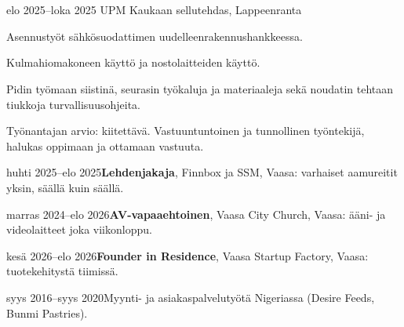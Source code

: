 \documentclass[a4paper,11pt]{article}
\begin{document}
\section{}
\begin{cventry}{elo 2025--loka 2025}{}
  UPM Kaukaan sellutehdas, Lappeenranta\par
  Asennustyöt sähkösuodattimen uudelleenrakennushankkeessa.\par
  Kulmahiomakoneen käyttö ja nostolaitteiden käyttö.\par
  Pidin työmaan siistinä, seurasin työkaluja ja materiaaleja sekä noudatin tehtaan tiukkoja turvallisuusohjeita.\par
  Työnantajan arvio: kiitettävä. Vastuuntuntoinen ja tunnollinen työntekijä, halukas oppimaan ja ottamaan vastuuta.
\end{cventry}
\begin{cventry}{huhti 2025--elo 2025}{\textbf{Lehdenjakaja}, Finnbox ja SSM, Vaasa: varhaiset aamureitit yksin, säällä kuin säällä.}
\end{cventry}
\begin{cventry}{marras 2024--elo 2026}{\textbf{AV-vapaaehtoinen}, Vaasa City Church, Vaasa: ääni- ja videolaitteet joka viikonloppu.}
\end{cventry}
\begin{cventry}{kesä 2026--elo 2026}{\textbf{Founder in Residence}, Vaasa Startup Factory, Vaasa: tuotekehitystä tiimissä.}
\end{cventry}
\begin{cventry}{syys 2016--syys 2020}{Myynti- ja asiakaspalvelutyötä Nigeriassa (Desire Feeds, Bunmi Pastries).}
\end{cventry}

\section{}

\section{}
\end{document}
